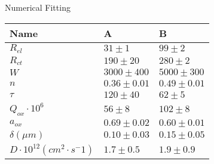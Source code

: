 \documentclass[10pt,compress,handout]{beamer}
\begin{document}
    \begin{frame}{Numerical Fitting}
        \begin{tabular}{lll}
            \toprule
            Name                               & A                 & B               \\ \midrule
            $R_{el}$                           & $31 \pm 1$        & $99 \pm 2$      \\
            $R_{ct}$                           & $190 \pm 20$      & $280 \pm 2$     \\
            $W$                                & $3000 \pm 400$    & $5000 \pm 300$  \\
            $n$                                & $0.36 \pm 0.01$   & $0.49 \pm 0.01$ \\
            $\tau$                             & $120 \pm 40$      & $62 \pm 5$      \\
            $Q_{ox} \cdot 10^6 $               & $56 \pm 8$        & $102 \pm 8$     \\
            $a_{ox}$                           & $0.69 \pm 0.02$   & $0.60 \pm 0.01$ \\
            $\delta(\mu m)$                    & $0.10 \pm 0.03$   & $0.15 \pm 0.05$ \\
            $D \cdot 10^{12} (cm^2 \cdot s^-1)$& $1.7 \pm 0.5$     & $1.9 \pm 0.9$   \\
            \bottomrule
        \end{tabular}
    \end{frame}
\end{document}

